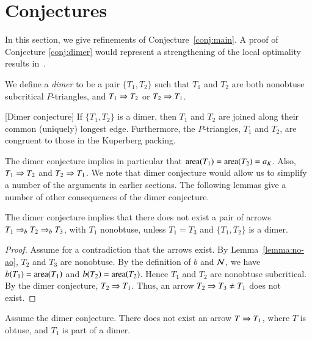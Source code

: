 \section{Conjectures}

In this section, we give refinements of Conjecture~\ref{conj:main}.  A
proof of Conjecture \ref{conj:dimer} would represent a strengthening
of the local optimality results in~\cite{Kus}.

\begin{definition}
  We define a {\it dimer} to be a pair $\{T_1,T_2\}$ such that $T_1$
  and $T_2$ are both nonobtuse subcritical $P$-triangles, and $T_1\Rightarrow
  T_2$ or $T_2\Rightarrow T_1$.
\end{definition}

\begin{conjecture}\label{conj:dimer}[Dimer conjecture]
  If $\{T_1,T_2\}$ is a dimer, then $T_1$ and $T_2$ are joined along
  their common (uniquely) longest edge. Furthermore, the
$P$-triangles, $T_1$ and $T_2$, are
  congruent to those in the Kuperberg packing.
\end{conjecture}

The dimer conjecture implies in particular that ${\operatorname{area}}(T_1)={\operatorname{area}}(T_2)
= a_K$.  Also, $T_1\Rightarrow T_2$ and $T_2\Rightarrow T_1$.  We note that dimer
conjecture would allow us to simplify a number of the arguments in
earlier sections.  The following lemmas give a number of other
consequences of the dimer conjecture.

\begin{lemma}\label{lemma:dimer}
  The dimer conjecture implies that there does not exist a pair of
  arrows $T_1 \Rightarrow_{b} T_2 \Rightarrow_{b} T_3$, with $T_1$ nonobtuse, unless
  $T_1= T_3$ and $\{T_1,T_2\}$ is a dimer.
\end{lemma}

\begin{proof} Assume for a contradiction that the arrows exist.  By
  Lemma~\ref{lemma:no-ao}, $T_2$ and $T_3$ are nonobtuse.  By the
  definition of $b$ and $\mathcal N$, we have $b(T_1) = {\operatorname{area}}(T_1)$ and $b(T_2) =
  {\operatorname{area}}(T_2)$.  Hence $T_1$ and $T_2$ are nonobtuse subcritical.  By
  the dimer conjecture, $T_2\Rightarrow T_1$.  Thus, an arrow $T_2\Rightarrow T_3\ne
  T_1$ does not exist.
\end{proof}

\begin{lemma}\label{lemma:dimer-obtuse} 
Assume the dimer conjecture.  There does not exist an
arrow $T\Rightarrow T_1$, where $T$ is obtuse, and $T_1$ is part of a dimer.
\end{lemma}


